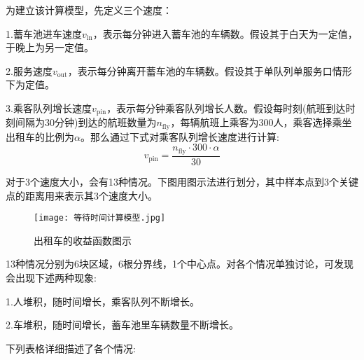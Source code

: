 \documentclass[withoutpreface,bwprint]{cumcmthesis} %
\begin{document}
为建立该计算模型，先定义三个速度：

1.蓄车池进车速度$v_{\mathrm{in}}$，表示每分钟进入蓄车池的车辆数。假设其于白天为一定值，于晚上为另一定值。

2.服务速度$v_{\mathrm{out}}$，表示每分钟离开蓄车池的车辆数。假设其于单队列单服务口情形下为定值。

3.乘客队列增长速度$v_{\mathrm{pin}}$，表示每分钟乘客队列增长人数。假设每时刻(航班到达时刻间隔为30分钟)到达的航班数量为$n_{\mathrm{fly}}$，每辆航班上乘客为300人，乘客选择乘坐出租车的比例为$\alpha$。那么通过下式对乘客队列增长速度进行计算:
\begin{equation}
	v_{\mathrm{pin}}=\frac{n_{\mathrm{fly}}\cdot 300 \cdot \alpha}{30}
\end{equation}

对于3个速度大小，会有13种情况。下图用图示法进行划分，其中样本点到3个关键点的距离用来表示其3个速度大小。

\begin{figure}[!h]
	\centering
	\texttt{[image: 等待时间计算模型.jpg]}
	\caption{出租车的收益函数图示}
\end{figure}

13种情况分别为6块区域，6根分界线，1个中心点。对各个情况单独讨论，可发现会出现下述两种现象:

1.人堆积，随时间增长，乘客队列不断增长。

2.车堆积，随时间增长，蓄车池里车辆数量不断增长。

下列表格详细描述了各个情况:
\end{document}
